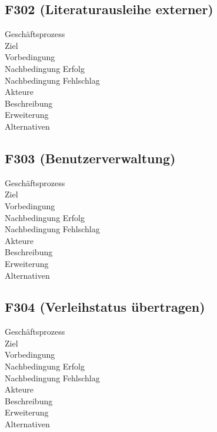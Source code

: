 \subsection{F302 (Literaturausleihe externer)}
\begin{description}
  \item[Geschäftsprozess]
  \item[Ziel]
  \item[Vorbedingung]
  \item[Nachbedingung Erfolg]
  \item[Nachbedingung Fehlschlag]
  \item[Akteure]
  \item[Beschreibung]
  \item[Erweiterung]
  \item[Alternativen]
\end{description}

\subsection{F303 (Benutzerverwaltung)}
\begin{description}
  \item[Geschäftsprozess]
  \item[Ziel]
  \item[Vorbedingung]
  \item[Nachbedingung Erfolg]
  \item[Nachbedingung Fehlschlag]
  \item[Akteure]
  \item[Beschreibung]
  \item[Erweiterung]
  \item[Alternativen]
\end{description}

\subsection{F304 (Verleihstatus übertragen)}
\begin{description}
  \item[Geschäftsprozess]
  \item[Ziel]
  \item[Vorbedingung]
  \item[Nachbedingung Erfolg]
  \item[Nachbedingung Fehlschlag]
  \item[Akteure]
  \item[Beschreibung]
  \item[Erweiterung]
  \item[Alternativen]
\end{description}

